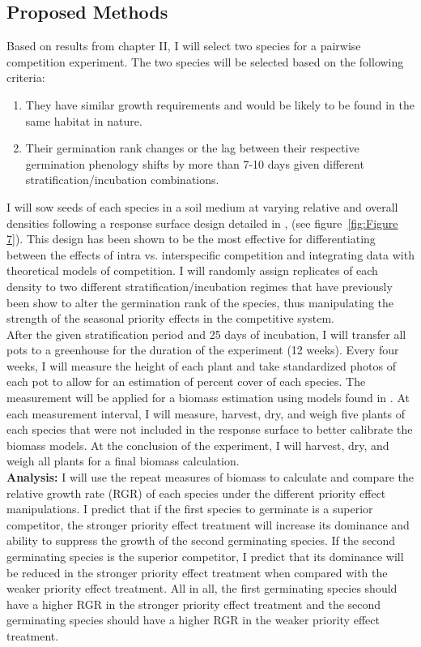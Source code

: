 \documentclass[12pt]{article}\usepackage[]{graphicx}\usepackage[]{color}
\begin{document}
\subsection*{Proposed Methods}
\indent\indent Based on results from chapter II, I will select two species for a pairwise competition experiment. The two species will be selected based on the following criteria:
\begin{enumerate}
\item They have similar growth requirements and would be likely to be found in the same habitat in nature.
\item Their germination rank changes or the lag between their respective germination phenology shifts by more than 7-10 days given different stratification/incubation combinations.
\end{enumerate}
\indent\indent I will sow seeds of each species in a soil medium at varying relative and overall densities following a response surface design detailed in \cite{Inouye2001}, (see figure~\ref{fig:Figure 7}). This design has been shown to be the most effective for differentiating between the effects of intra vs. interspecific competition and integrating data with theoretical models of competition. I will randomly assign replicates of each density to two different stratification/incubation regimes that have previously been show to alter the germination rank of the species, thus manipulating the strength of the seasonal priority effects in the competitive system.\\
\indent After the given stratification period and 25 days of incubation, I will transfer all pots to a greenhouse for the duration of the experiment (12 weeks). Every four weeks, I will measure the height of each plant and take standardized photos of each pot to allow for an estimation of percent cover of each species. The measurement will be applied for a biomass estimation using models found in \citet{Axmanova2012}. At each measurement interval, I will measure, harvest, dry, and weigh five plants of each species that were not included in the response surface to better calibrate the biomass models. At the conclusion of the experiment, I will harvest, dry, and weigh all plants for a final biomass calculation.\\
\indent\textbf{Analysis:} I will use the repeat measures of biomass to calculate and compare the relative growth rate (RGR) \citep{Connolly2005} of each species under the different priority effect manipulations. I predict that if the first species to germinate is a superior competitor, the stronger priority effect treatment will increase its dominance and ability to suppress the growth of the second germinating species. If the second germinating species is the superior competitor, I predict that its dominance will be reduced in the stronger priority effect treatment when compared with the weaker priority effect treatment. All in all, the first germinating species should have a higher RGR in the stronger priority effect treatment and the second germinating species should have a higher RGR in the weaker priority effect treatment.\\
\end{document}
